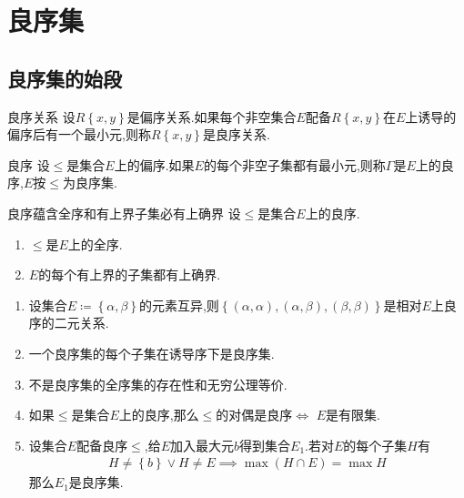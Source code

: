\chapter{良序集}

\section{良序集的始段}

\begin{definition}{良序关系}{}
	设$R\left\{x,y\right\}$是偏序关系.如果每个非空集合$E$配备$R\left\{x,y\right\}$在$E$上诱导的偏序后有一个最小元,则称$R\left\{x,y\right\}$是良序关系.
\end{definition}

\begin{definition}{良序}{}
	设$\leq$是集合$E$上的偏序.如果$E$的每个非空子集都有最小元,则称$\Gamma$是$E$上的良序,$E$按$\leq$为良序集.
\end{definition}

\begin{proposition}{良序蕴含全序和有上界子集必有上确界}{}
	设$\leq$是集合$E$上的良序.
	\begin{enumerate}
		\item $\leq$是$E$上的全序.
		\item $E$的每个有上界的子集都有上确界.
	\end{enumerate}
\end{proposition}

\begin{example}{}{}
	\begin{enumerate}
		\item 设集合$E\coloneq\left\{\alpha,\beta\right\}$的元素互异,则$\left\{\left(\alpha,\alpha\right),\left(\alpha,\beta\right),\left(\beta,\beta\right)\right\}$是相对$E$上良序的二元关系.
		\item 一个良序集的每个子集在诱导序下是良序集.
		\item 不是良序集的全序集的存在性和无穷公理等价.
		\item 如果$\leq$是集合$E$上的良序,那么$\leq$的对偶是良序$\iff$ $E$是有限集.
		\item 设集合$E$配备良序$\leq$,给$E$加入最大元$b$得到集合$E_{1}$.若对$E$的每个子集$H$有
		\begin{align*}
			H\neq\left\{b\right\}\vee H\neq E\implies\max\left(H\cap E\right)=\max H
		\end{align*}
		那么$E_{1}$是良序集.
	\end{enumerate}
\end{example}

